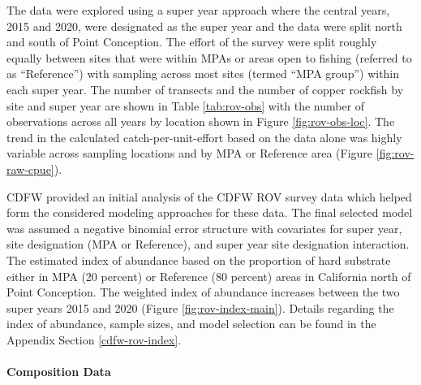 \documentclass[11pt,
  english,
  letterpaper,
]{article}
\begin{document}
The data were explored using a super year approach where the central years, 2015 and 2020, were designated as the super year and the data were split north and south of Point Conception. The effort of the survey were split roughly equally between sites that were within MPAs or areas open to fishing (referred to as ``Reference'') with sampling across most sites (termed ``MPA group'') within each super year. The number of transects and the number of copper rockfish by site and super year are shown in Table \ref{tab:rov-obs} with the number of observations across all years by location shown in Figure \ref{fig:rov-obs-loc}. The trend in the calculated catch-per-unit-effort based on the data alone was highly variable across sampling locations and by MPA or Reference area (Figure \ref{fig:rov-raw-cpue}).

CDFW provided an initial analysis of the CDFW ROV survey data which helped form the considered modeling approaches for these data. The final selected model was assumed a negative binomial error structure with covariates for super year, site designation (MPA or Reference), and super year site designation interaction. The estimated index of abundance based on the proportion of hard substrate either in MPA (20 percent) or Reference (80 percent) areas in California north of Point Conception. The weighted index of abundance increases between the two super years 2015 and 2020 (Figure \ref{fig:rov-index-main}). Details regarding the index of abundance, sample sizes, and model selection can be found in the Appendix Section \ref{cdfw-rov-index}.

\hypertarget{composition-data-3}{%
\paragraph{Composition Data}\label{composition-data-3}}

\hfill\break
\end{document}
